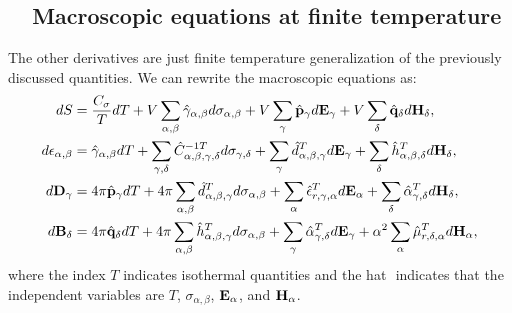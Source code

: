 \documentclass[12pt,a4paper,twoside]{report}
\begin{document}
{\subsection{\color{web-blue}\ \ Macroscopic equations at finite temperature}

The other derivatives are just finite temperature generalization of the
previously discussed quantities. We can rewrite the macroscopic equations as:
\begin{align}
dS&= {C_\sigma\over T} dT+ V \sum_{\alpha,\beta} \hat \gamma_{\alpha,\beta} 
d\sigma_{\alpha,\beta}
+ V \sum_\gamma \hat {\bf p}_\gamma d{\bf E}_{\gamma} + 
V \sum_\delta \hat {\bf q}_\delta d{\bf H}_{\delta}, \\
d\epsilon_{\alpha,\beta}&= \hat \gamma_{\alpha,\beta} dT + 
\sum_{\gamma,\delta} \hat C^{-1 T}_{\alpha,\beta,\gamma,\delta} 
d \sigma_{\gamma,\delta} + \sum_\gamma \hat d^T_{\alpha,\beta,\gamma} 
d{\bf E}_{\gamma} +
\sum_\delta \hat h^T_{\alpha,\beta,\delta} d{\bf H}_{\delta}, \\
d{\bf D}_\gamma&= 
4 \pi \hat {\bf p}_\gamma dT + 4 \pi \sum_{\alpha,\beta} \hat 
d^T_{\alpha,\beta,\gamma} d\sigma_{\alpha,\beta}
+ \sum_\alpha \hat \epsilon^T_{r,\gamma,\alpha} d{\bf E}_{\alpha} + 
\sum_\delta \hat \alpha^T_{\gamma,\delta} d{\bf H}_{\delta}, \\
d{\bf B}_\delta&= 
4 \pi \hat {\bf q}_\delta dT+ 4 \pi \sum_{\alpha,\beta}
\hat h^T_{\alpha,\beta,\gamma}
d\sigma_{\alpha,\beta}
+\sum_\gamma \hat \alpha^T_{\gamma,\delta}
d{\bf E}_{\gamma}+ \alpha^2
\sum_\alpha \hat \mu^T_{r,\delta,\alpha}
d{\bf H}_{\alpha}, 
\end{align}
where the index $T$ indicates isothermal quantities and the hat $\hat{}$
indicates that the independent variables are $T$, $\sigma_{\alpha,\beta}$, 
${\bf E}_\alpha$, and ${\bf H}_\alpha$.  
}
\end{document}
